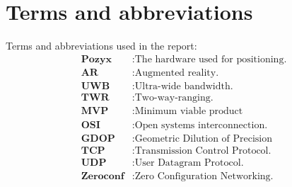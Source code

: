 \chapter*{Terms and abbreviations}
Terms and abbreviations used in the report:
\begin{align*}
    \textbf{Pozyx}    & : \text{The hardware used for positioning.} \\
    \textbf{AR}       & : \text{Augmented reality.}                 \\
    \textbf{UWB}      & : \text{Ultra-wide bandwidth.}              \\
    \textbf{TWR}      & : \text{Two-way-ranging.}                   \\
    \textbf{MVP}      & : \text{Minimum viable product}             \\
    \textbf{OSI}      & : \text{Open systems interconnection.}      \\
    \textbf{GDOP}     & : \text{Geometric Dilution of Precision}    \\
    \textbf{TCP}      & : \text{Transmission Control Protocol.}     \\
    \textbf{UDP}      & : \text{User Datagram Protocol.}            \\
    \textbf{Zeroconf} & : \text{Zero Configuration Networking.}     \\
\end{align*}